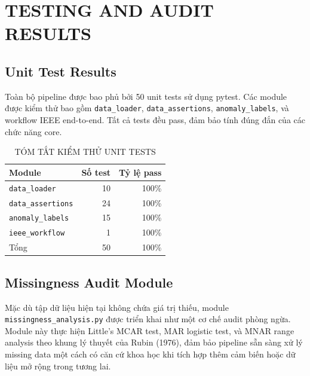 \section{TESTING AND AUDIT RESULTS}
\label{app:tests}

\subsection{Unit Test Results}

Toàn bộ pipeline được bao phủ bởi 50 unit tests sử dụng pytest.
Các module được kiểm thử bao gồm \texttt{data\_loader}, \texttt{data\_assertions}, \texttt{anomaly\_labels}, và workflow IEEE end-to-end.
Tất cả tests đều pass, đảm bảo tính đúng đắn của các chức năng core.

\begin{table}[htbp]
\caption{TÓM TẮT KIỂM THỬ UNIT TESTS}
\label{tab:tests}
\centering
\small
\begin{tabular}{@{}lrr@{}}
\toprule
Module & Số test & Tỷ lệ pass \\
\midrule
\texttt{data\_loader} & 10 & 100\% \\
\texttt{data\_assertions} & 24 & 100\% \\
\texttt{anomaly\_labels} & 15 & 100\% \\
\texttt{ieee\_workflow} & 1 & 100\% \\
\midrule
Tổng & 50 & 100\% \\
\bottomrule
\end{tabular}
\end{table}

\subsection{Missingness Audit Module}

Mặc dù tập dữ liệu hiện tại không chứa giá trị thiếu,
module \texttt{missingness\_analysis.py} được triển khai như một cơ chế audit phòng ngừa.
Module này thực hiện Little's MCAR test, MAR logistic test, và MNAR range analysis
theo khung lý thuyết của Rubin (1976),
đảm bảo pipeline sẵn sàng xử lý missing data một cách có căn cứ khoa học
khi tích hợp thêm cảm biến hoặc dữ liệu mở rộng trong tương lai.

